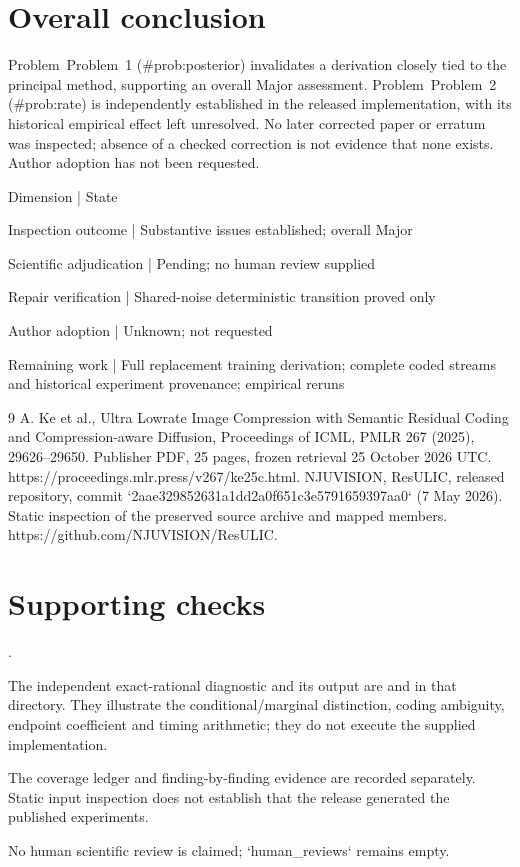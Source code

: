 \documentclass[10pt]{article}
\begin{document}
\section*{Overall conclusion}
Problem Problem 1 (\#prob:posterior) invalidates a derivation closely tied to the principal method, supporting an overall Major assessment. Problem Problem 2 (\#prob:rate) is independently established in the released implementation, with its historical empirical effect left unresolved. No later corrected paper or erratum was inspected; absence of a checked correction is not evidence that none exists. Author adoption has not been requested.\par
Dimension | State\par
Inspection outcome | Substantive issues established; overall Major\par
Scientific adjudication | Pending; no human review supplied\par
Repair verification | Shared-noise deterministic transition proved only\par
Author adoption | Unknown; not requested\par
Remaining work | Full replacement training derivation; complete coded streams and historical experiment provenance; empirical reruns\par
9 A. Ke et al., Ultra Lowrate Image Compression with Semantic Residual Coding and Compression-aware Diffusion, Proceedings of ICML, PMLR 267 (2025), 29626–29650. Publisher PDF, 25 pages, frozen retrieval 25 October 2026 UTC. https://proceedings.mlr.press/v267/ke25c.html. NJUVISION, ResULIC, released repository, commit `2aae329852631a1dd2a0f651c3e5791659397aa0` (7 May 2026). Static inspection of the preserved source archive and mapped members. https://github.com/NJUVISION/ResULIC.\par
\section*{Supporting checks}
.\par
The independent exact-rational diagnostic and its output are and in that directory. They illustrate the conditional/marginal distinction, coding ambiguity, endpoint coefficient and timing arithmetic; they do not execute the supplied implementation.\par
The coverage ledger and finding-by-finding evidence are recorded separately. Static input inspection does not establish that the release generated the published experiments.\par
No human scientific review is claimed; `human\_reviews` remains empty.\par
\end{document}
